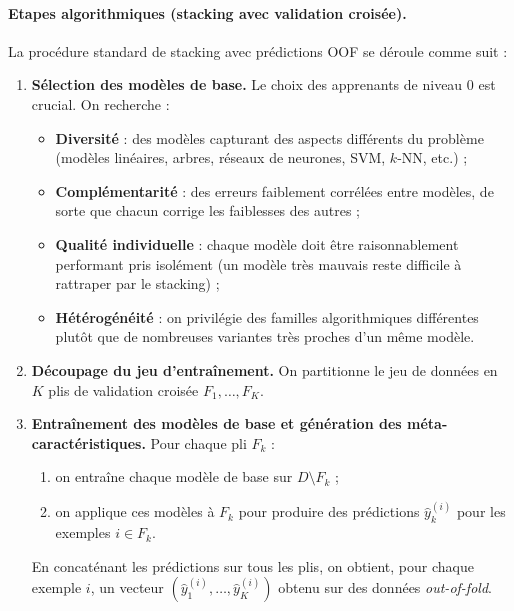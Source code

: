 \paragraph{Etapes algorithmiques (stacking avec validation croisée).}
La procédure standard de stacking avec prédictions OOF se déroule comme suit :
\begin{enumerate}
  \item \textbf{Sélection des modèles de base.} Le choix des apprenants de niveau 0 est crucial. On
  recherche :
  \begin{itemize}
    \item \textbf{Diversité} : des modèles capturant des aspects différents du problème (modèles
    linéaires, arbres, réseaux de neurones, SVM, $k$-NN, etc.) ;
    \item \textbf{Complémentarité} : des erreurs faiblement corrélées entre modèles, de sorte que
    chacun corrige les faiblesses des autres ;
    \item \textbf{Qualité individuelle} : chaque modèle doit être raisonnablement performant pris
    isolément (un modèle très mauvais reste difficile à rattraper par le stacking) ;
    \item \textbf{Hétérogénéité} : on privilégie des familles algorithmiques différentes plutôt que
    de nombreuses variantes très proches d'un même modèle.
  \end{itemize}

  \item \textbf{Découpage du jeu d'entraînement.} On partitionne le jeu de données en $K$ plis de
  validation croisée $F_1,\dots,F_K$.

  \item \textbf{Entraînement des modèles de base et génération des méta-caractéristiques.}
  Pour chaque pli $F_k$ :
  \begin{enumerate}
    \item on entraîne chaque modèle de base sur $D \setminus F_k$ ;
    \item on applique ces modèles à $F_k$ pour produire des prédictions $\hat{y}_k^{(i)}$ pour les
    exemples $i \in F_k$.
  \end{enumerate}
  En concaténant les prédictions sur tous les plis, on obtient, pour chaque exemple $i$, un
  vecteur $(\hat{y}_1^{(i)},\dots,\hat{y}_K^{(i)})$ obtenu sur des données \emph{out-of-fold}.


\end{enumerate}
